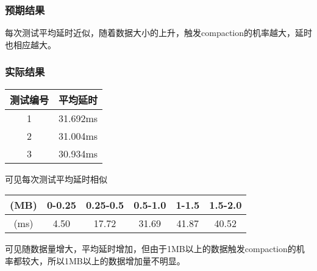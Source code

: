 \documentclass{ctexart}
\begin{document}
\subsubsection{预期结果}
每次测试平均延时近似，随着数据大小的上升，触发compaction的机率越大，延时也相应越大。

\subsubsection{实际结果}
\begin{tabular}{cc}
  \hline
  测试编号 & 平均延时 \\
  \hline
  1        & 31.692ms \\
  2        & 31.004ms \\
  3        & 30.934ms \\

  \hline
\end{tabular}

可见每次测试平均延时相似

\begin{tabular}{cccccc}
  \hline
  (MB) & 0-0.25 & 0.25-0.5 & 0.5-1.0 & 1-1.5 & 1.5-2.0 \\
  \hline
  (ms) & 4.50   & 17.72    & 31.69   & 41.87 & 40.52   \\

  \hline
\end{tabular}

可见随数据量增大，平均延时增加，但由于1MB以上的数据触发compaction的机率都较大，所以1MB以上的数据增加量不明显。
\end{document}

